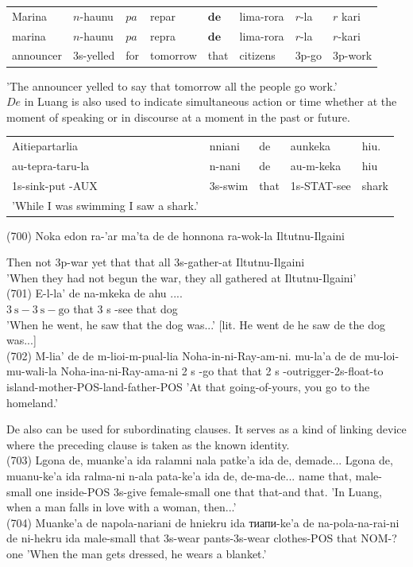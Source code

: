 \documentclass[10pt]{article}
\begin{document}
\begin{center}
\begin{tabular}{llllllll}
Marina & \(n\)-haunu & \(p a\) & repar & \(\boldsymbol{d e}\) & lima-rora & \(r\)-la & \(r\) kari \\
marina & \(n\)-haunu & \(p a\) & repra & \(\boldsymbol{d e}\) & lima-rora & \(r\)-la & \(r\)-kari \\
announcer & 3s-yelled & for & tomorrow & that & citizens & 3p-go & 3p-work \\
\end{tabular}
\end{center}

'The announcer yelled to say that tomorrow all the people go work.'\\
\(D e\) in Luang is also used to indicate simultaneous action or time whether at the moment of speaking or in discourse at a moment in the past or future.

\begin{center}
\begin{tabular}{lllll}
Aitiepartarlia & nniani & de & aunkeka & hiu. \\
au-tepra-taru-la & n-nani & de & au-m-keka & hiu \\
1s-sink-put -AUX & 3s-swim & that & 1s-STAT-see & shark \\
'While I was swimming I saw a shark.' &  &  &  &  \\
\end{tabular}
\end{center}

(700) Noka edon ra-'ar ma'ta de de honnona ra-wok-la Iltutnu-Ilgaini

Then not 3p-war yet that that all 3s-gather-at Iltutnu-Ilgaini\\
'When they had not begun the war, they all gathered at Iltutnu-Ilgaini'\\
(701) E-l-la' de na-mkeka de ahu ....\\
\(3 \mathrm{~s}-3 \mathrm{~s}-\mathrm{go}\) that 3 s -see that dog\\[0pt]
'When he went, he saw that the dog was...' [lit. He went de he saw de the dog was...]\\
(702) M-lia' de de m-lioi-m-pual-lia Noha-in-ni-Ray-am-ni. mu-la'a de de mu-loi-mu-wali-la Noha-ina-ni-Ray-ama-ni 2 s -go that that 2 s -outrigger-2s-float-to island-mother-POS-land-father-POS 'At that going-of-yours, you go to the homeland.'

De also can be used for subordinating clauses. It serves as a kind of linking device where the preceding clause is taken as the known identity.\\
(703) Lgona de, muanke'a ida ralamni nala patke'a ida de, demade... Lgona de, muanu-ke'a ida ralma-ni n-ala pata-ke'a ida de, de-ma-de... name that, male-small one inside-POS 3s-give female-small one that that-and that. 'In Luang, when a man falls in love with a woman, then...'\\
(704) Muanke'a de napola-nariani de hniekru ida тиапи-ke'a de na-pola-na-rai-ni de ni-hekru ida male-small that 3s-wear pants-3s-wear clothes-POS that NOM-? one 'When the man gets dressed, he wears a blanket.'
\end{document}
